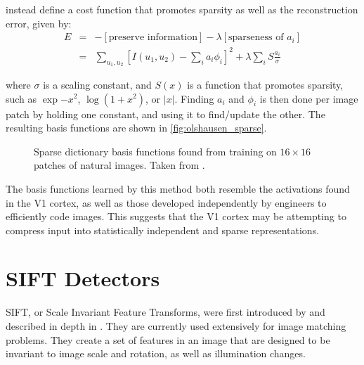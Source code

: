   \citeauthor{olshausen_emergence_1996} instead define a cost function that
  promotes sparsity as well as the reconstruction error, given by:
    \begin{eqnarray}
    E & = & -\left[\text{preserve information}\right]
            -\lambda \left[\text{sparseness of $a_{i}$}\right] \\
      & = & \sum_{u_1,u_2} {\left[I(u_1,u_2)-\sum_{i} a_{i} \phi_{i} \right]}^2 + 
            \lambda \sum_{i} S \frac{a_{i}}{\sigma}
    \end{eqnarray}

  where $\sigma$ is a scaling constant, and $S(x)$ is a function that promotes
  sparsity, such as $\exp{-x^2}$, $\log (1+x^2)$, or $|x|$. Finding $a_i$ and
  $\phi_i$ is then done per image patch by holding one constant, and using it to
  find/update the other. The resulting basis functions are shown in
  \autoref{fig:olshausen_sparse}.

  \begin{figure}
    \begin{center}
      \caption[Olshausen and Field sparse dictionary basis functions]
      {Sparse dictionary basis functions found from training on $16\times 16$ patches of
               natural images. Taken from \citep{olshausen_emergence_1996}.}
       \label{fig:olshausen_sparse}
    \end{center}
  \end{figure}

  The basis functions learned by this method both resemble the activations found
  in the V1 cortex, as well as those developed independently by engineers to
  efficiently code images. This suggests that the V1 cortex may be attempting to
  compress input into statistically independent and sparse representations.

\section{SIFT Detectors}
  SIFT, or Scale Invariant Feature Transforms, were first introduced by
  \citet{lowe_object_1999} and described in depth in \citep{lowe_distinctive_2004}.
  They are currently used extensively for image matching problems. They create
  a set of features in an image that are designed to be invariant to image scale and rotation,
  as well as illumination changes. 


